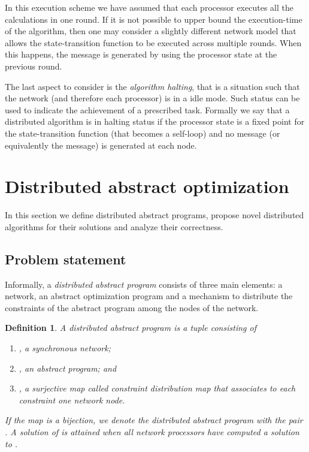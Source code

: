 \documentclass[onecolumn,journal,letterpaper]{IEEEtran}
\newtheorem{definition}[theorem]{Definition}
\begin{document}
In this execution scheme we have assumed that each processor executes all
the calculations in one round. If it is not possible to upper bound the
execution-time of the algorithm, then one may consider a slightly different
network model that allows the state-transition function to be executed
across multiple rounds. When this happens, the message is generated by
using the processor state at the previous round.

The last aspect to consider is the \emph{algorithm halting}, that is a
situation such that the network (and therefore each processor) is in a idle
mode.  Such status can be used to indicate the achievement of a prescribed
task.  Formally we say that a distributed algorithm is in halting status if
the processor state is a fixed point for the state-transition function
(that becomes a self-loop) and no message (or equivalently the 
message) is generated at each node.


\section{Distributed abstract optimization}
\label{sec:network-ALP}
In this section we define distributed abstract programs, propose novel
distributed algorithms for their solutions and analyze their correctness.


\subsection{Problem statement}
Informally, a \emph{distributed abstract program} consists of three main
elements: a network, an abstract optimization program and a mechanism to
distribute the constraints of the abstract program among the nodes of the
network.
\begin{definition}
  A distributed abstract program is a tuple  consisting of
  \begin{enumerate}
  \item , a synchronous network;
  \item , an abstract program; and
  \item , a surjective map called
    \emph{constraint distribution map} that associates to each constraint
    one network node.
  \end{enumerate}
  If the map  is a bijection, we denote the distributed abstract
  program with the pair . A \emph{solution} of  is attained when all network processors have
  computed a solution to .
\end{definition}
\end{document}
